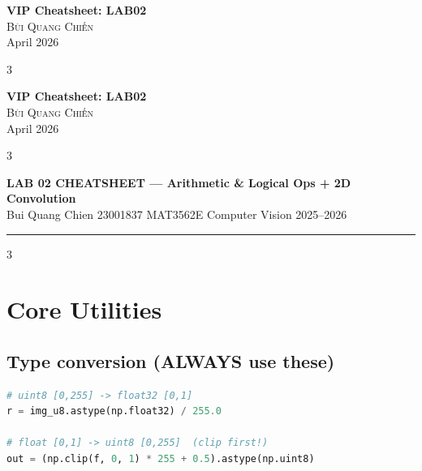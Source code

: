 \documentclass[9pt,landscape,a4paper]{extarticle}
\begin{document}
\begin{center}
    {\Large \bfseries VIP Cheatsheet: LAB02} \\
    \vspace{0.3cm}
    {\large \textsc{Bùi Quang Chiến}} \\
    \vspace{0.2cm}
    {\small April 2026}
\end{center}
\vspace{0.3cm}

\begin{multicols*}{3}

\begin{center}
    {\Large \bfseries VIP Cheatsheet: LAB02} \\
    \vspace{0.3cm}
    {\large \textsc{Bùi Quang Chiến}} \\
    \vspace{0.2cm}
    {\small April 2026}
\end{center}
\vspace{0.3cm}

\begin{multicols*}{3}

\begin{center}
  {\large\bfseries\color{hdr} LAB 02 CHEATSHEET — Arithmetic \& Logical Ops + 2D Convolution} \\
  {\small Bui Quang Chien \textbullet{} 23001837 \textbullet{} MAT3562E Computer Vision 2025--2026}
\end{center}
\hrule\vspace{2pt}

\begin{multicols}{3}

\section{Core Utilities}

\subsection{Type conversion (ALWAYS use these)}
\begin{lstlisting}[language=Python]
# uint8 [0,255] -> float32 [0,1]
r = img_u8.astype(np.float32) / 255.0

# float [0,1] -> uint8 [0,255]  (clip first!)
out = (np.clip(f, 0, 1) * 255 + 0.5).astype(np.uint8)


\end{lstlisting}
\end{multicols}
\end{multicols*}
\end{multicols*}
\end{document}
